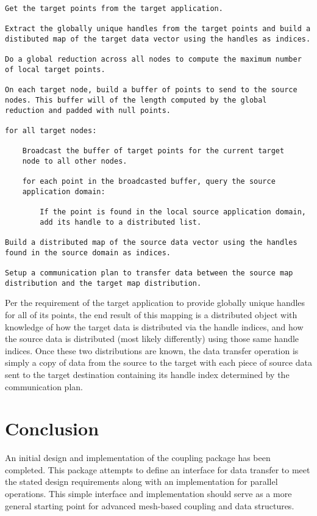 \documentclass[letterpaper]{article}
\begin{document}
\begin{verbatim}
Get the target points from the target application.

Extract the globally unique handles from the target points and build a
distibuted map of the target data vector using the handles as indices.

Do a global reduction across all nodes to compute the maximum number
of local target points.

On each target node, build a buffer of points to send to the source
nodes. This buffer will of the length computed by the global
reduction and padded with null points.

for all target nodes:

    Broadcast the buffer of target points for the current target
    node to all other nodes.

    for each point in the broadcasted buffer, query the source
    application domain:

        If the point is found in the local source application domain,
        add its handle to a distributed list.

Build a distributed map of the source data vector using the handles
found in the source domain as indices.

Setup a communication plan to transfer data between the source map
distribution and the target map distribution.
\end{verbatim}

Per the requirement of the target application to provide globally
unique handles for all of its points, the end result of this mapping
is a distributed object with knowledge of how the target data is
distributed via the handle indices, and how the source
data is distributed (most likely differently) using those same handle
indices. Once these two distributions are known, the data transfer
operation is simply a copy of data from the source to the target with
each piece of source data sent to the target destination containing
its handle index determined by the communication plan. 

\section{Conclusion}
An initial design and implementation of the coupling package has been
completed. This package attempts to define an interface for data
transfer to meet the stated design requirements along with an
implementation for parallel operations. This simple interface and
implementation should serve as a more general starting point for
advanced mesh-based coupling and data structures.
\end{document}
